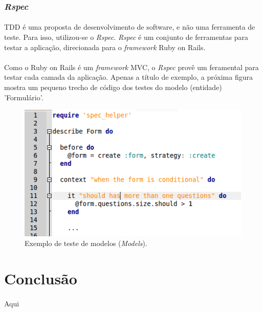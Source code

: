 \documentclass[11pt]{article}
\begin{document}
    \subsubsection{{\em Rspec}}
  
    \paragraph{}

    TDD é uma proposta de desenvolvimento de software, e não uma 
    ferramenta de teste. Para isso, utilizou-se o {\em Rspec}. {\em Rspec}
    é um conjunto de ferramentas para testar a aplicação, direcionada para o
    {\em framework} Ruby on Rails.
    
    \paragraph{}
    
    Como o Ruby on Rails é um {\em framework} MVC, o {\em Rspec} provê um
    feramental para testar cada camada da aplicação. Apenas a título de 
    exemplo, a próxima figura mostra um pequeno trecho de código dos 
    testes do modelo (entidade) 'Formulário'.
    
    \begin{figure}[h!]
      \centering
      \includegraphics[width=1.0\textwidth]{model_test.png}
      \caption{Exemplo de teste de modelos ({\em Models}).}
    \end{figure}
    
  \clearpage
      
  \section{Conclusão}

    \paragraph{}    
    Aqui
      
  \newpage
  {}
  
  
\end{document}

